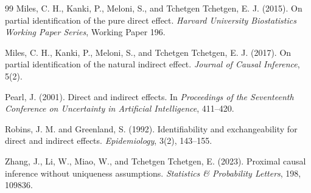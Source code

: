 \documentclass[11pt]{article}
\theoremstyle{definition}
\theoremstyle{plain}
\theoremstyle{remark}
\begin{document}
\begin{thebibliography}{99}
Miles, C. H., Kanki, P., Meloni, S., and Tchetgen Tchetgen, E. J. (2015).
On partial identification of the pure direct effect.
\emph{Harvard University Biostatistics Working Paper Series}, Working Paper 196.

Miles, C. H., Kanki, P., Meloni, S., and Tchetgen Tchetgen, E. J. (2017).
On partial identification of the natural indirect effect.
\emph{Journal of Causal Inference}, 5(2).

Pearl, J. (2001).
Direct and indirect effects.
In \emph{Proceedings of the Seventeenth Conference on Uncertainty in Artificial Intelligence},
411--420.

Robins, J. M. and Greenland, S. (1992).
Identifiability and exchangeability for direct and indirect effects.
\emph{Epidemiology}, 3(2), 143--155.

Zhang, J., Li, W., Miao, W., and Tchetgen Tchetgen, E. (2023).
Proximal causal inference without uniqueness assumptions.
\emph{Statistics \& Probability Letters}, 198, 109836.
\end{thebibliography}
\end{document}
